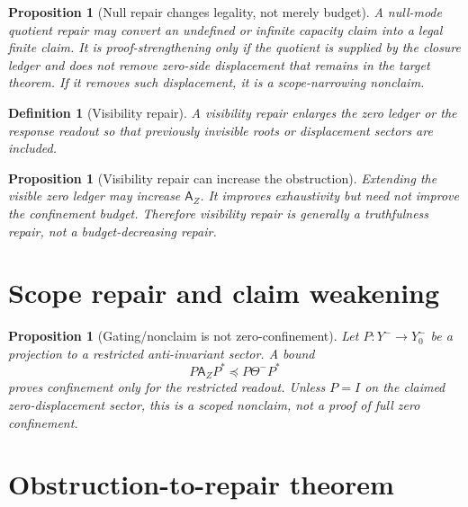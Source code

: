\documentclass[11pt]{article}
\newtheorem{proposition}[theorem]{Proposition}
\newtheorem{definition}[theorem]{Definition}
\newcommand{\AZ}{\mathsf A_Z}
\newcommand{\Loewner}{\preceq}
\begin{document}
\begin{proposition}[Null repair changes legality, not merely budget]
A null-mode quotient repair may convert an undefined or infinite capacity claim into a legal finite claim.  It is proof-strengthening only if the quotient is supplied by the closure ledger and does not remove zero-side displacement that remains in the target theorem.  If it removes such displacement, it is a scope-narrowing nonclaim.
\end{proposition}

\begin{definition}[Visibility repair]
A visibility repair enlarges the zero ledger or the response readout so that previously invisible roots or displacement sectors are included.
\end{definition}

\begin{proposition}[Visibility repair can increase the obstruction]
Extending the visible zero ledger may increase $\AZ$.  It improves exhaustivity but need not improve the confinement budget.  Therefore visibility repair is generally a truthfulness repair, not a budget-decreasing repair.
\end{proposition}

\section{Scope repair and claim weakening}

\begin{proposition}[Gating/nonclaim is not zero-confinement]
Let $P:Y^-\to Y^-_0$ be a projection to a restricted anti-invariant sector.  A bound
\[
  P\AZ P^*\Loewner P\Theta^-P^*
\]
proves confinement only for the restricted readout.  Unless $P=I$ on the claimed zero-displacement sector, this is a scoped nonclaim, not a proof of full zero confinement.
\end{proposition}

\section{Obstruction-to-repair theorem}
\end{document}
